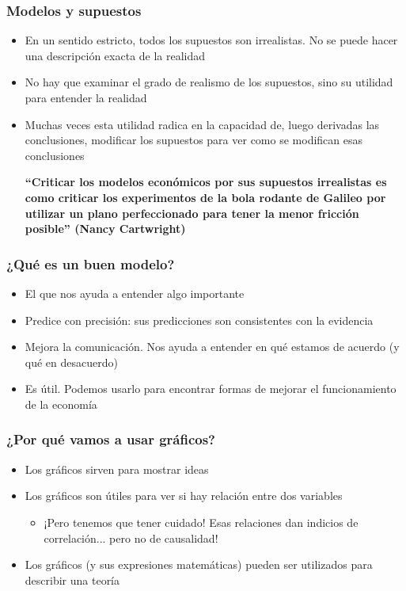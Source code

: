 \documentclass{beamer}
\begin{document}
\begin{frame}
\frametitle{Modelos y supuestos}
\begin{itemize}
    \item En un sentido estricto, todos los supuestos son irrealistas. No se puede hacer una descripción exacta de la realidad
    \item No hay que examinar el grado de realismo de los supuestos, sino su utilidad para entender la realidad
    \item Muchas veces esta utilidad radica en la capacidad de, luego derivadas las conclusiones, modificar los supuestos para ver como se modifican esas conclusiones
    \begin{center}
        \begin{boxA}
            \textbf{“Criticar los modelos económicos por sus supuestos irrealistas es como criticar los experimentos de la bola rodante de Galileo por utilizar un plano perfeccionado para tener la menor fricción posible” (Nancy Cartwright)}
        \end{boxA}
    \end{center}
    
\end{itemize}
\end{frame}

\begin{frame}
\frametitle{¿Qué es un buen modelo?}
\begin{itemize}
    \item El que nos ayuda a entender algo importante
    \item Predice con precisión: sus predicciones son consistentes con la evidencia \vspace{1mm}
    \item Mejora la comunicación. Nos ayuda a entender en qué estamos de acuerdo (y qué en desacuerdo) \vspace{1mm}
    \item Es útil. Podemos usarlo para encontrar formas de mejorar el funcionamiento de la economía
\end{itemize} 
\end{frame}

\begin{frame}
\frametitle{¿Por qué vamos a usar gráficos?}
\begin{itemize}
    \item Los gráficos sirven para mostrar ideas \vspace{2mm}
    \item Los gráficos son útiles para ver si hay relación entre dos variables 
     \begin{itemize}
        \item ¡Pero tenemos que tener cuidado! Esas relaciones dan indicios de correlación... pero no de causalidad! \vspace{2mm}
    \end{itemize}
    \item Los gráficos (y sus expresiones matemáticas) pueden ser utilizados para describir una teoría
\end{itemize} 
\end{frame}
\end{document}
